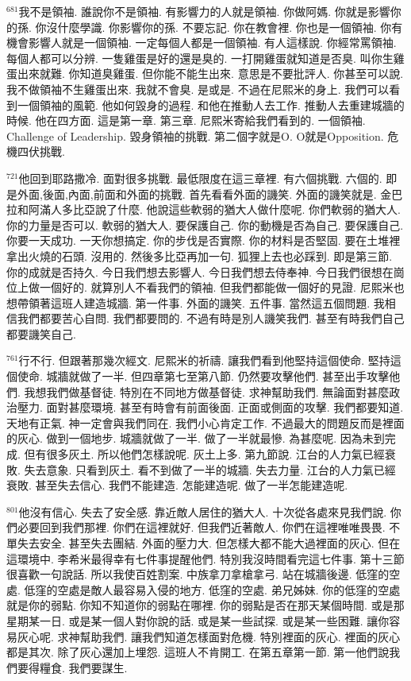 \documentclass{book}
\begin{document}
$^{681}$我不是領袖.
誰說你不是領袖.
有影響力的人就是領袖.
你做阿媽.
你就是影響你的孫.
你沒什麼學識.
你影響你的孫.
不要忘記.
你在教會裡.
你也是一個領袖.
你有機會影響人就是一個領袖.
一定每個人都是一個領袖.
有人這樣說.
你經常罵領袖.
每個人都可以分辨.
一隻雞蛋是好的還是臭的.
一打開雞蛋就知道是否臭.
叫你生雞蛋出來就難.
你知道臭雞蛋.
但你能不能生出來.
意思是不要批評人.
你甚至可以說.
我不做領袖不生雞蛋出來.
我就不會臭.
是或是.
不過在尼熙米的身上.
我們可以看到一個領袖的風範.
他如何毀身的過程.
和他在推動人去工作.
推動人去重建城牆的時候.
他在四方面.
這是第一章.
第三章.
尼熙米寄給我們看到的.
一個領袖.
Challenge of Leadership.
毀身領袖的挑戰.
第二個字就是O.
O就是Opposition.
危機四伏挑戰.

$^{721}$他回到耶路撒冷.
面對很多挑戰.
最低限度在這三章裡.
有六個挑戰.
六個的.
即是外面,後面,內面,前面和外面的挑戰.
首先看看外面的譏笑.
外面的譏笑就是.
金巴拉和阿滿人多比亞說了什麼.
他說這些軟弱的猶大人做什麼呢.
你們軟弱的猶大人.
你的力量是否可以.
軟弱的猶大人.
要保護自己.
你的動機是否為自己.
要保護自己.
你要一天成功.
一天你想搞定.
你的步伐是否實際.
你的材料是否堅固.
要在土堆裡拿出火燒的石頭.
沒用的.
然後多比亞再加一句.
狐狸上去也必踩到.
即是第三節.
你的成就是否持久.
今日我們想去影響人.
今日我們想去侍奉神.
今日我們很想在崗位上做一個好的.
就算別人不看我們的領袖.
但我們都能做一個好的見證.
尼熙米也想帶領著這班人建造城牆.
第一件事.
外面的譏笑.
五件事.
當然這五個問題.
我相信我們都要苦心自問.
我們都要問的.
不過有時是別人譏笑我們.
甚至有時我們自己都要譏笑自己.

$^{761}$行不行.
但跟著那幾次經文.
尼熙米的祈禱.
讓我們看到他堅持這個使命.
堅持這個使命.
城牆就做了一半.
但四章第七至第八節.
仍然要攻擊他們.
甚至出手攻擊他們.
我想我們做基督徒.
特別在不同地方做基督徒.
求神幫助我們.
無論面對甚麼政治壓力.
面對甚麼環境.
甚至有時會有前面後面.
正面或側面的攻擊.
我們都要知道.
天地有正氣.
神一定會與我們同在.
我們小心肯定工作.
不過最大的問題反而是裡面的灰心.
做到一個地步.
城牆就做了一半.
做了一半就最慘.
為甚麼呢.
因為未到完成.
但有很多灰土.
所以他們怎樣說呢.
灰土上多.
第九節說.
江台的人力氣已經衰敗.
失去意象.
只看到灰土.
看不到做了一半的城牆.
失去力量.
江台的人力氣已經衰敗.
甚至失去信心.
我們不能建造.
怎能建造呢.
做了一半怎能建造呢.

$^{801}$他沒有信心.
失去了安全感.
靠近敵人居住的猶大人.
十次從各處來見我們說.
你們必要回到我們那裡.
你們在這裡就好.
但我們近著敵人.
你們在這裡唯唯畏畏.
不單失去安全.
甚至失去團結.
外面的壓力大.
但怎樣大都不能大過裡面的灰心.
但在這環境中.
李希米最得幸有七件事提醒他們.
特別我沒時間看完這七件事.
第十三節很喜歡一句說話.
所以我使百姓割案.
中族拿刀拿槍拿弓.
站在城牆後邊.
低窪的空處.
低窪的空處是敵人最容易入侵的地方.
低窪的空處.
弟兄姊妹.
你的低窪的空處就是你的弱點.
你知不知道你的弱點在哪裡.
你的弱點是否在那天某個時間.
或是那星期某一日.
或是某一個人對你說的話.
或是某一些試探.
或是某一些困難.
讓你容易灰心呢.
求神幫助我們.
讓我們知道怎樣面對危機.
特別裡面的灰心.
裡面的灰心都是其次.
除了灰心還加上埋怨.
這班人不肯開工.
在第五章第一節.
第一他們說我們要得糧食.
我們要謀生.
\end{document}
